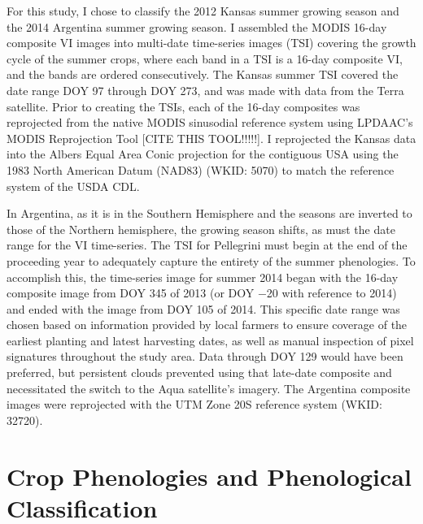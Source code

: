 For this study, I chose to classify the 2012 Kansas summer growing season and the 2014 Argentina summer growing season. I assembled the MODIS 16-day composite VI images into multi-date time-series images (TSI) covering the growth cycle of the summer crops, where each band in a TSI is a 16-day composite VI, and the bands are ordered consecutively. The Kansas summer TSI covered the date range DOY 97 through DOY 273, and was made with data from the Terra satellite. Prior to creating the TSIs, each of the 16-day composites was reprojected from the native MODIS sinusodial reference system using LPDAAC's MODIS Reprojection Tool [CITE THIS TOOL!!!!!]. I reprojected the Kansas data into the Albers Equal Area Conic projection for the contiguous USA using the 1983 North American Datum (NAD83) (WKID: 5070) to match the reference system of the USDA CDL.

In Argentina, as it is in the Southern Hemisphere and the seasons are inverted to those of the Northern hemisphere, the growing season shifts, as must the date range for the VI time-series. The TSI for Pellegrini must begin at the end of the proceeding year to adequately capture the entirety of the summer phenologies. To accomplish this, the time-series image for summer 2014 began with the 16-day composite image from DOY 345 of 2013 (or DOY −20 with reference to 2014) and ended with the image from DOY 105 of 2014. This specific date range was chosen based on information provided by local farmers to ensure coverage of the earliest planting and latest harvesting dates, as well as manual inspection of pixel signatures throughout the study area. Data through DOY 129 would have been preferred, but persistent clouds prevented using that late-date composite and necessitated the switch to the Aqua satellite's imagery. The Argentina composite images were reprojected with the UTM Zone 20S reference system (WKID: 32720).

\section{Crop Phenologies and Phenological Classification}

